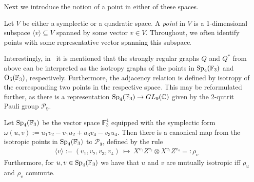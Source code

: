Next we introduce the notion of a point in either of these spaces.
\begin{definition}
    Let $V$ be either a symplectic or a quadratic space.
    A \emph{point} in $V$ is a 1-dimensional subspace $\langle v \rangle \subseteq V$ spanned by some vector $v \in V$. Throughout, we often identify points with some representative vector spanning this subspace.
\end{definition}
Interestingly, in~\cite{Brouwer_Van_Maldeghem_2022} it is mentioned that
the strongly regular graphs $Q$ and $Q^*$ from above can be interpreted as the
isotropy graphs of the points in $\operatorname{Sp}_4(\mathbb{F}_3)$ and $\operatorname{O}_5(\mathbb{F}_3)$, respectively.
%
Furthermore, the adjacency relation is defined by isotropy of the corresponding
two points in the respective space.
%
This may be reformulated further,
as there is a representation $\operatorname{Sp}_4(\mathbb{F}_3) \rightarrow GL_9(\mathbb{C})$ 
given by the 2-qutrit Pauli group $\mathcal{P}_9$.
\begin{lemma}
    Let $\operatorname{Sp}_4(\mathbb{F}_3)$ be the vector space $\mathbb{F}_3^4$ equipped with the symplectic form
    $\omega(u, v) := u_1 v_2 - v_1 u_2 + u_3 v_4 - v_3 u_4$.
    Then there is a canonical map from the isotropic points in $\operatorname{Sp}_4(\mathbb{F}_3)$ to $\mathcal{P}_9$,
    defined by the rule
    \begin{align}
        \langle v \rangle := (v_1, v_2, v_3, v_4)~\mapsto~X^{v_1} Z^{v_2} \otimes X^{v_3} Z^{v_4} =: \rho_v
    \end{align} 
    Furthermore, for $u, v \in \operatorname{Sp}_4(\mathbb{F}_3)$ we have that $u$ and $v$ are mutually isotropic iff $\rho_u$ and $\rho_v$ commute.
\end{lemma}
